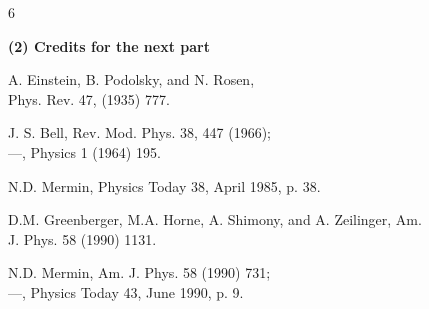 \documentclass[12pt,nofootinbib]{revtex4}
\begin{document}
\begin{figure}[htb] 
\begin{mdframed}
  \vspace{5pt}\hfill 6\\[-18pt]
  \begin{center}
    \textbf{(2) Credits for the next part}%
  \end{center}
  \begin{raggedright}
  \begin{enumerate}[label={[\roman*]}]
    \item A. Einstein, B. Podolsky, and N. Rosen,\\ %
      Phys. Rev. 47, (1935) 777. %
    \item J. S. Bell, %
      Rev. Mod. Phys. 38, 447 (1966);\\
      ---, %
      Physics 1 (1964) 195.
    \item N.D. Mermin, %
      Physics Today 38, April 1985, p. 38.

    \item D.M. Greenberger, M.A. Horne, A. Shimony, and A. Zeilinger, %
      Am. J. Phys. 58 (1990) 1131.
      
    \item N.D. Mermin, %
      Am. J. Phys. 58 (1990) 731;\\
      ---, %
      Physics Today 43, June 1990, p. 9.
  \end{enumerate}
  \end{raggedright}
  \vspace{6pt}
\end{mdframed}
\end{figure}
\end{document}
